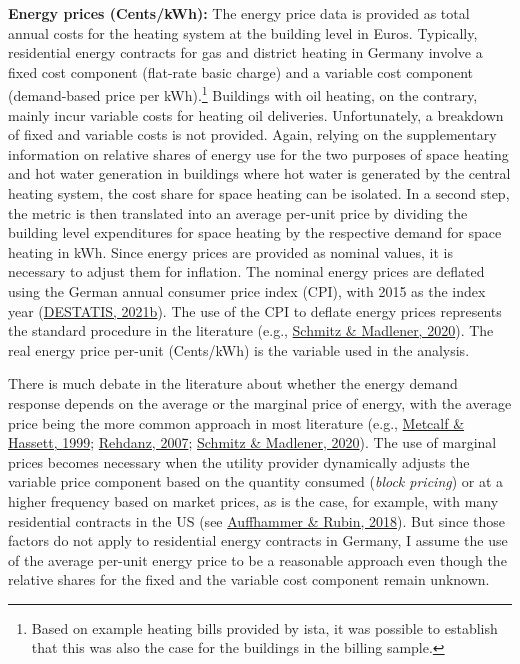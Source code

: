 \documentclass[12pt,twoside]{reedthesis}
\begin{document}
\textbf{Energy prices (Cents/kWh):} The energy price data is provided as total annual costs for the heating system at the building level in Euros. Typically, residential energy contracts for gas and district heating in Germany involve a fixed cost component (flat-rate basic charge) and a variable cost component (demand-based price per kWh).\footnote{Based on example heating bills provided by ista, it was possible to establish that this was also the case for the buildings in the billing sample.} Buildings with oil heating, on the contrary, mainly incur variable costs for heating oil deliveries. Unfortunately, a breakdown of fixed and variable costs is not provided. Again, relying on the supplementary information on relative shares of energy use for the two purposes of space heating and hot water generation in buildings where hot water is generated by the central heating system, the cost share for space heating can be isolated. In a second step, the metric is then translated into an average per-unit price by dividing the building level expenditures for space heating by the respective demand for space heating in kWh. Since energy prices are provided as nominal values, it is necessary to adjust them for inflation. The nominal energy prices are deflated using the German annual consumer price index (CPI), with 2015 as the index year (\protect\hyperlink{ref-destatis21}{DESTATIS, 2021b}). The use of the CPI to deflate energy prices represents the standard procedure in the literature (e.g., \protect\hyperlink{ref-schmitz_madlener20}{Schmitz \& Madlener, 2020}). The real energy price per-unit (Cents/kWh) is the variable used in the analysis.

There is much debate in the literature about whether the energy demand response depends on the average or the marginal price of energy, with the average price being the more common approach in most literature (e.g., \protect\hyperlink{ref-metcalf_hassett99}{Metcalf \& Hassett, 1999}; \protect\hyperlink{ref-rehdanz07}{Rehdanz, 2007}; \protect\hyperlink{ref-schmitz_madlener20}{Schmitz \& Madlener, 2020}). The use of marginal prices becomes necessary when the utility provider dynamically adjusts the variable price component based on the quantity consumed (\emph{block pricing}) or at a higher frequency based on market prices, as is the case, for example, with many residential contracts in the US (see \protect\hyperlink{ref-auffhammer_rubin18}{Auffhammer \& Rubin, 2018}). But since those factors do not apply to residential energy contracts in Germany, I assume the use of the average per-unit energy price to be a reasonable approach even though the relative shares for the fixed and the variable cost component remain unknown.
\end{document}
